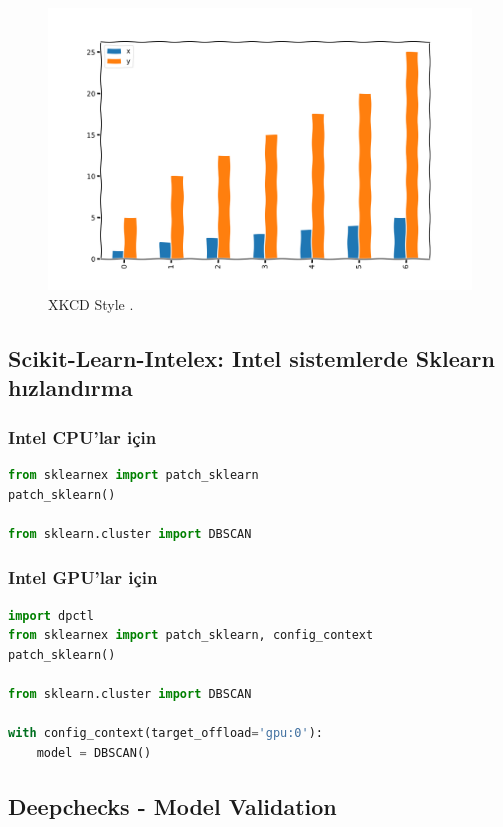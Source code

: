 \begin{figure}[ht]
    \centering
    \includegraphics[width=1.0\textwidth]{images/style_xkcd.png}
    \caption{XKCD Style .}
    \label{fig:enter-label}
\end{figure}

\newpage

\subsection{Scikit-Learn-Intelex: Intel sistemlerde Sklearn hızlandırma}
\subsubsection{Intel CPU'lar için}
\begin{lstlisting}[language=Python]
from sklearnex import patch_sklearn
patch_sklearn()

from sklearn.cluster import DBSCAN
\end{lstlisting}

\subsubsection{Intel GPU'lar için}
\begin{lstlisting}[language=Python]
import dpctl
from sklearnex import patch_sklearn, config_context
patch_sklearn()

from sklearn.cluster import DBSCAN

with config_context(target_offload='gpu:0'):
	model = DBSCAN()
\end{lstlisting}

\subsection{Deepchecks - Model Validation}

